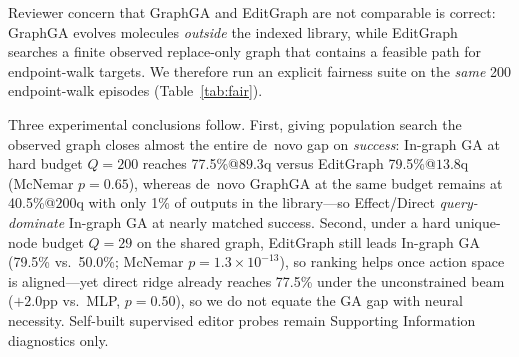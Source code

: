 \documentclass[journal=jcisd8,manuscript=article,email=false]{achemso}
\begin{document}
Reviewer concern that GraphGA and EditGraph are not comparable is correct: GraphGA evolves molecules \emph{outside} the indexed library, while EditGraph searches a finite observed replace-only graph that contains a feasible path for endpoint-walk targets. We therefore run an explicit fairness suite on the \emph{same} 200 endpoint-walk episodes (Table~\ref{tab:fair}).

\begin{table}[t]
\caption{Fairness suite on 200 endpoint-walk episodes. \emph{In-graph GA} uses the same observed replace-only edges as EditGraph. \emph{GraphGA de~novo} uses official mol-opt operators and may leave the library. Effect/Direct queries use unique-node accounting (Table~\ref{tab:direct}); GA/GraphGA budgets are hard unique-node caps (not matched to Effect's mean). Self-built supervised editor rows are in the Supporting Information.}
\label{tab:fair}
\centering
\small
{}
\end{table}

Three experimental conclusions follow. First, giving population search the observed graph closes almost the entire de~novo gap on \emph{success}: In-graph GA at hard budget $Q{=}200$ reaches 77.5\%@$89.3$q versus EditGraph 79.5\%@$13.8$q (McNemar $p{=}0.65$), whereas de~novo GraphGA at the same budget remains at 40.5\%@$200$q with only 1\% of outputs in the library---so Effect/Direct \emph{query-dominate} In-graph GA at nearly matched success. Second, under a hard unique-node budget $Q{=}29$ on the shared graph, EditGraph still leads In-graph GA (79.5\% vs.\ 50.0\%; McNemar $p{=}1.3\times10^{-13}$), so ranking helps once action space is aligned---yet direct ridge already reaches 77.5\% under the unconstrained beam ($+2.0$pp vs.\ MLP, $p{=}0.50$), so we do not equate the GA gap with neural necessity. Self-built supervised editor probes remain Supporting Information diagnostics only.
\end{document}
